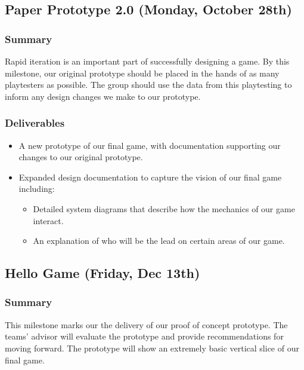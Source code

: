 \subsection{Paper Prototype 2.0 (Monday, October 28th)}

\subsubsection*{Summary}
Rapid iteration is an important part of successfully designing a game. By this
milestone, our original prototype should be placed in the hands of as many
playtesters as possible. The group should use the data from this playtesting to
inform any design changes we make to our prototype.

\subsubsection*{Deliverables}
\begin{itemize}
	\item A new prototype of our final game, with documentation supporting our
	changes to our original prototype.
	\item Expanded design documentation to capture the vision of our final game
	including:
	\begin{itemize}
		\item Detailed system diagrams that describe how the mechanics of our game
		interact.
		\item An explanation of who will be the lead on certain areas of our game.
	\end{itemize}
\end{itemize}

\subsection{Hello Game (Friday, Dec 13th)}

\subsubsection*{Summary}
This milestone marks our the delivery of our proof of concept prototype. The teams' 
advisor will evaluate the prototype and provide recommendations for moving forward. 
The prototype will show an extremely basic vertical slice of our final game. 

